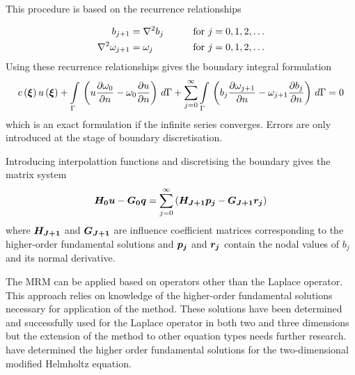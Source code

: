 This procedure is based on the recurrence relationships

\begin{alignat}{2}
  b_{j+1} & = \laplacian{}{b_{j}} & \qquad \text{for }j &= 0,1,2,\ldots
  \label{eq:recurr} \\
  \laplacian{}{\omega_{j+1}} & = \omega_{j} & \qquad \text{for }j &= 0,1,2,\ldots
  \label{eq:higher}
\end{alignat}
Using these recurrence relationships gives the boundary integral formulation
\begin{equation}
  \fnof{c}{\vect{\xi}} \fnof{u}{\vect{\xi}} + 
  \goneint{\pbrac{u\delby{\omega_{0}}{n} - \omega_{0} \delby{u}{n}}}{\Gamma} +
  \dsuml{j=0}{\infty}   \goneint{\pbrac{b_{j}\delby{\omega_{j+1}}{n} 
      - \omega_{j+1} \delby{b_{j}}{n}}}{\Gamma} = 0
\end{equation}
which is an exact formulation if the infinite series converges.  Errors are
only introduced at the stage of boundary discretisation.  

Introducing interpolattion functions and discretising the boundary gives
the matrix system
\begin{equation}
  \matr{H_{0}} \vect{u} - \matr{G_{0}} \vect{q} = \dsuml{j=0}{\infty}
  \pbrac{\matr{H_{j+1}} \vect{P_{j}} - \matr{G_{j+1}} \vect{R_{j}}}
\end{equation}
where $\matr{H_{j+1}}$ and $\matr{G_{j+1}}$ are influence coefficient
matrices corresponding to the higher-order fundamental solutions and
$\vect{p_{j}}$ and $\vect{r_{j}}$ contain the nodal values of $b_{j}$ and its
normal derivative. 

The MRM can be applied based on operators other than the Laplace operator.
This approach relies on knowledge of the higher-order fundamental solutions
necessary for application of the method.  These solutions have been
determined and successfully used for the Laplace operator in both two and
three dimensions but the extension of the method to other equation types
needs further research.   have determined the higher
order fundamental solutions for the two-dimensional modified Helmholtz
equation.

